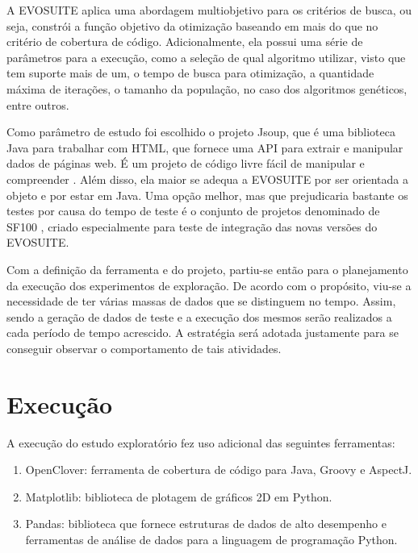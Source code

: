 A EVOSUITE aplica uma abordagem multiobjetivo para os critérios de busca, ou seja, constrói a função objetivo da otimização baseando em mais do que no critério de cobertura de código. Adicionalmente, ela possui uma série de parâmetros para a execução, como a seleção de qual algoritmo utilizar, visto que tem suporte mais de um, o tempo de busca para otimização, a quantidade máxima de iterações, o tamanho da população, no caso dos algoritmos genéticos, entre outros. 

Como parâmetro de estudo foi escolhido o projeto Jsoup\footnotemark {}, que é uma biblioteca Java para trabalhar com HTML, que fornece uma API para extrair e manipular dados de páginas web. É um projeto de código livre fácil de manipular e compreender \cite{hedley2009jsoup}. Além disso, ela maior se adequa a EVOSUITE por ser orientada a objeto e por estar em Java. Uma opção melhor, mas que prejudicaria bastante os testes por causa do tempo de teste é o conjunto de projetos denominado de SF100 \cite{TOSEM_evaluation}, criado especialmente para teste de integração das novas versões do EVOSUITE.

Com a definição da ferramenta e do projeto, partiu-se então para o planejamento da execução dos experimentos de exploração. De acordo com o propósito, viu-se a necessidade de ter várias massas de dados que se distinguem no tempo. Assim, sendo a geração de dados de teste e a execução dos mesmos serão realizados a cada período de tempo acrescido. A estratégia será adotada justamente para se conseguir observar o comportamento de tais atividades.

\section{Execução \label{sec:execucao}}

A execução do estudo exploratório fez uso adicional das seguintes ferramentas:

\begin{enumerate}
    \item OpenClover\footnotemark {}: ferramenta de cobertura de código para Java, Groovy e AspectJ.
    \item Matplotlib\footnotemark {}: biblioteca de plotagem de gráficos 2D em Python.
    \item Pandas\footnotemark {}: biblioteca que fornece estruturas de dados de alto desempenho e ferramentas de análise de dados para a linguagem de programação Python.
\end{enumerate}

